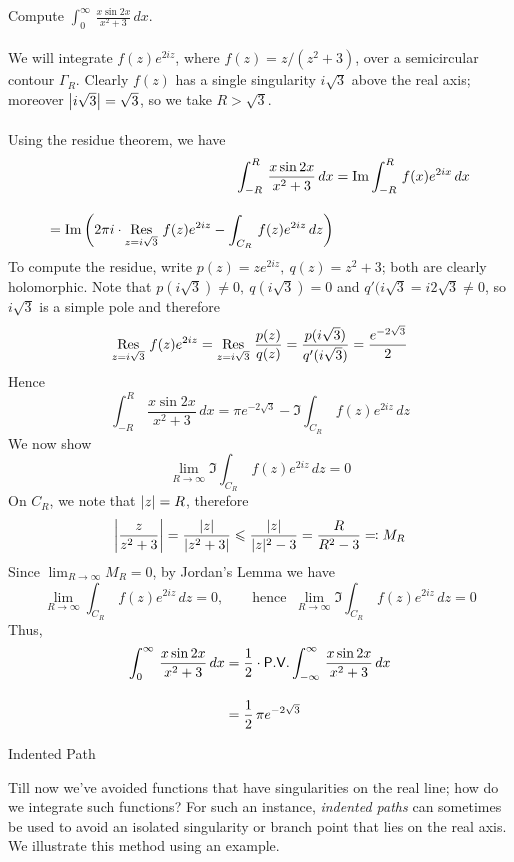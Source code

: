 \begin{example}
Compute $\displaystyle \int_0^\infty\,\frac{x\sin 2x}{x^2 + 3}\,dx$.\\
\\
We will integrate $f(z)e^{2iz}$, where $f(z) = z/(z^2 + 3)$, over a semicircular contour $\Gamma_R$. Clearly $f(z)$ has a single singularity $i\sqrt{3}$ above the real axis; moreover $\left\lvert i\sqrt{3}\right\rvert = \sqrt{3}$, so we take $R > \sqrt{3}$.\\
\\
Using the residue theorem, we have
\begin{align*}
\int_{-R}^R\,\frac{x\sin 2x}{x^2 + 3}\,dx &= \operatorname{Im}\int_{-R}^R\,f(x)e^{2ix}\,dx\\[1em]
= \operatorname{Im}\left(2\pi i\cdot\underset{z = {i\sqrt{3}}}{\operatorname{Res}}\,\,f(z)e^{2iz} - \int_{C_R}\,f(z)e^{2iz}\,dz\right)
\end{align*}
To compute the residue, write $p(z) = ze^{2iz},\ q(z) = z^2 + 3$; both are clearly holomorphic. Note that $p(i\sqrt{3}) \neq 0,\ q(i\sqrt{3}) = 0$ and $q'(i\sqrt{3} = i2\sqrt{3} \neq 0$, so $i\sqrt{3}$ is a simple pole and therefore
\[\underset{z = {i\sqrt{3}}}{\operatorname{Res}}\,\,f(z)e^{2iz} = \underset{z = {i\sqrt{3}}}{\operatorname{Res}}\,\,\frac{p(z)}{q(z)} = \frac{p(i\sqrt{3})}{q'(i\sqrt{3})} = \frac{e^{-2\sqrt{3}}}{2}\]
Hence
\[\int_{-R}^R\,\frac{x\sin 2x}{x^2 + 3}\,dx = \pi e^{-2\sqrt{3}} - \Im\int_{C_R}\,f(z)e^{2iz}\,dz\]
We now show
\[\lim_{R \to \infty}\Im\int_{C_R}\,f(z)e^{2iz}\,dz = 0\]
On $C_R$, we note that $\left\lvert z\right\rvert = R$, therefore 
\[\left\lvert\frac{z}{z^2 + 3}\right\rvert = \frac{|z|}{|z^2 + 3|} \leqslant \frac{|z|}{|z|^2 - 3} = \frac{R}{R^2 - 3} \eqqcolon M_R\]
Since $\lim_{R \to \infty}M_R = 0$, by Jordan's Lemma we have
\[\lim_{R \to \infty}\int_{C_R}\,f(z)e^{2iz}\,dz = 0,\qquad \text{hence }\ \lim_{R \to \infty}\Im\int_{C_R}\,f(z)e^{2iz}\,dz = 0\]
Thus,
\begin{align*}
\int_0^\infty\,\frac{x\sin 2x}{x^2 + 3}\,dx &= \frac{1}{2}\cdot\mathsf{P.V.}\int_{-\infty}^\infty\,\frac{x\sin 2x}{x^2 + 3}\,dx\\[1em]
 &= \frac{1}{2}\,\pi e^{-2\sqrt{3}}
\end{align*}
\end{example}

\vspace*{2em}

\begin{mdframed}
\begin{center}
{\Large Indented Path}
\end{center}
\end{mdframed}

\begin{discussion}
Till now we've avoided functions that have singularities on the real line; how do we integrate such functions? For such an instance, \emph{indented paths} can sometimes be used to avoid an isolated singularity or branch point that lies on the real axis. We illustrate this method using an example.
\end{discussion}

